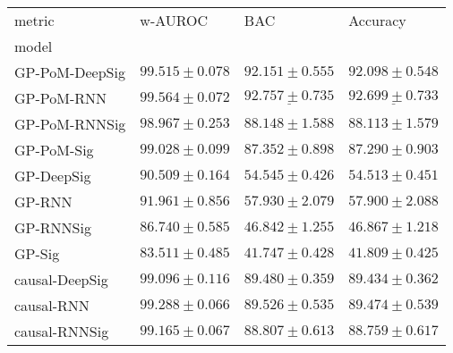 \begin{tabular}{llll}
\toprule
metric &                                        w-AUROC &                                            BAC &                                       Accuracy \\
model          &                                                &                                                &                                                \\
\midrule
GP-PoM-DeepSig &                           $ 99.515 \pm 0.078 $ &                           $ 92.151 \pm 0.555 $ &                           $ 92.098 \pm 0.548 $ \\
GP-PoM-RNN     &                           $ 99.564 \pm 0.072 $ &            $  \underline{ 92.757 \pm 0.735 } $ &            $  \underline{ 92.699 \pm 0.733 } $ \\
GP-PoM-RNNSig  &                           $ 98.967 \pm 0.253 $ &                           $ 88.148 \pm 1.588 $ &                           $ 88.113 \pm 1.579 $ \\
GP-PoM-Sig     &                           $ 99.028 \pm 0.099 $ &                           $ 87.352 \pm 0.898 $ &                           $ 87.290 \pm 0.903 $ \\
GP-DeepSig     &                           $ 90.509 \pm 0.164 $ &                           $ 54.545 \pm 0.426 $ &                           $ 54.513 \pm 0.451 $ \\
GP-RNN         &                           $ 91.961 \pm 0.856 $ &                           $ 57.930 \pm 2.079 $ &                           $ 57.900 \pm 2.088 $ \\
GP-RNNSig      &                           $ 86.740 \pm 0.585 $ &                           $ 46.842 \pm 1.255 $ &                           $ 46.867 \pm 1.218 $ \\
GP-Sig         &                           $ 83.511 \pm 0.485 $ &                           $ 41.747 \pm 0.428 $ &                           $ 41.809 \pm 0.425 $ \\
causal-DeepSig &                           $ 99.096 \pm 0.116 $ &                           $ 89.480 \pm 0.359 $ &                           $ 89.434 \pm 0.362 $ \\
causal-RNN     &                           $ 99.288 \pm 0.066 $ &                           $ 89.526 \pm 0.535 $ &                           $ 89.474 \pm 0.539 $ \\
causal-RNNSig  &                           $ 99.165 \pm 0.067 $ &                           $ 88.807 \pm 0.613 $ &                           $ 88.759 \pm 0.617 $ \\

\end{tabular}
